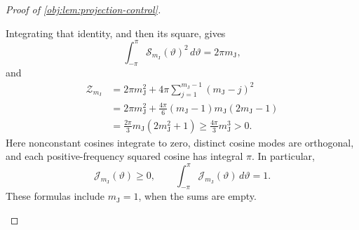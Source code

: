 \documentclass[11pt]{article}
\begin{document}
\begin{proof}[Proof of \cref{obj:lem:projection-control}]
\begin{enumerate}
Integrating that identity, and then its square, gives
\[
\int_{-\pi}^{\pi}\mathcal S_{m_{\mathrm J}}(\vartheta)^2\,d\vartheta
=2\pi m_{\mathrm J},
\]
and
\[
\begin{aligned}
\mathcal Z_{m_{\mathrm J}}
&=2\pi m_{\mathrm J}^2
  +4\pi\sum_{j=1}^{m_{\mathrm J}-1}(m_{\mathrm J}-j)^2\\
&=2\pi m_{\mathrm J}^2
  +\frac{4\pi}{6}(m_{\mathrm J}-1)m_{\mathrm J}(2m_{\mathrm J}-1)\\
&=\frac{2\pi}{3}m_{\mathrm J}(2m_{\mathrm J}^2+1)
 \ge\frac{4\pi}{3}m_{\mathrm J}^3>0.
\end{aligned}
\]
Here nonconstant cosines integrate to zero, distinct cosine modes are orthogonal, and each positive-frequency squared cosine has integral \(\pi\). In particular,
\[
\mathcal J_{m_{\mathrm J}}(\vartheta)\ge0,
\qquad
\int_{-\pi}^{\pi}\mathcal J_{m_{\mathrm J}}(\vartheta)\,d\vartheta=1.
\]
These formulas include \(m_{\mathrm J}=1\), when the sums are empty.


\end{enumerate}
\end{proof}
\end{document}
